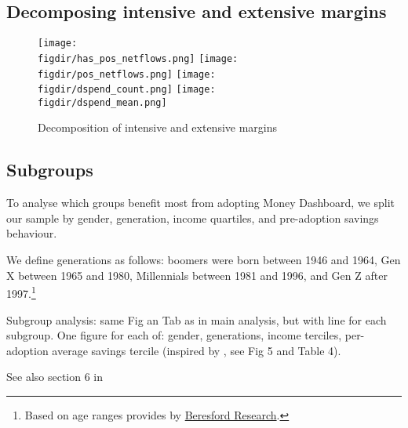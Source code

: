 



\subsection{Decomposing intensive and extensive margins}%
\label{sub:decomposing_intensive_and_extensive_margins}
\begin{figure}[H]
    \centering
    \caption{Decomposition of intensive and extensive margins}%
    \label{fig:intext}
    \texttt{[image: \\figdir/has\_pos\_netflows.png]}
    \texttt{[image: \\figdir/pos\_netflows.png]}
    \texttt{[image: \\figdir/dspend\_count.png]}
    \texttt{[image: \\figdir/dspend\_mean.png]}
\end{figure}



\subsection{Subgroups}%
\label{sub:subgroups}
To analyse which groups benefit most from adopting Money Dashboard, we split
our sample by gender, generation, income quartiles, and pre-adoption savings
behaviour.

We define generations as follows: boomers were born between 1946 and 1964, Gen
X between 1965 and 1980, Millennials between 1981 and 1996, and Gen Z after
1997.\footnote{Based on age ranges provides by
    \href{https://www.beresfordresearch.com/age-range-by-generation/}{Beresford
Research}.}

Subgroup analysis: same Fig an Tab as in main analysis, but with line for each
subgroup. One figure for each of: gender, generations, income terciles,
per-adoption average savings tercile (inspired by \citet{carlin2017fintech},
see Fig 5 and Table 4).

See also section 6 in \citet{gargano2021goal}


